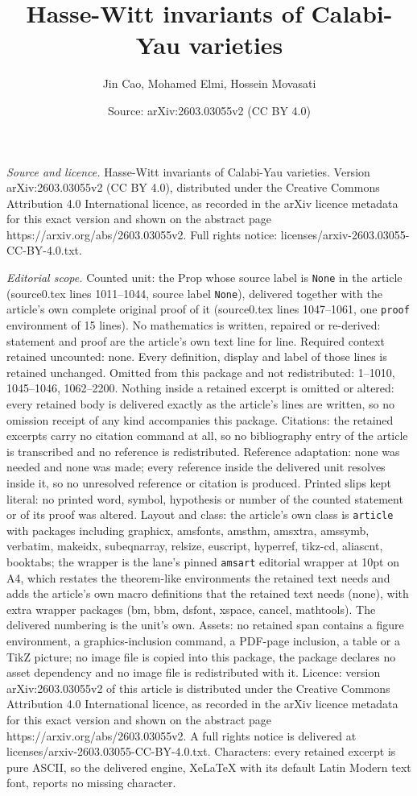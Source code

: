 \documentclass[10pt,a4paper]{amsart}
\title[Hasse-Witt invariants of Calabi-Yau varieties]{Hasse-Witt invariants of Calabi-Yau varieties}
\author{Jin Cao, Mohamed Elmi, Hossein Movasati}
\date{Source: arXiv:2603.03055v2 (CC BY 4.0)}
\begin{document}
\maketitle

\noindent\emph{Source and licence.} Hasse-Witt invariants of Calabi-Yau varieties. Version arXiv:2603.03055v2 (CC BY 4.0), distributed under the Creative Commons Attribution 4.0 International licence, as recorded in the arXiv licence metadata for this exact version and shown on the abstract page https://arxiv.org/abs/2603.03055v2. Full rights notice: licenses/arxiv-2603.03055-CC-BY-4.0.txt.\par\smallskip

\noindent\textit{Editorial scope.} Counted unit: the Prop whose source label is \texttt{None} in the article (source0.tex lines 1011--1044, source label \texttt{None}), delivered together with the article's own complete original proof of it (source0.tex lines 1047--1061, one \texttt{proof} environment of 15 lines). No mathematics is written, repaired or re-derived: statement and proof are the article's own text line for line. Required context retained uncounted: none. Every definition, display and label of those lines is retained unchanged. Omitted from this package and not redistributed: 1--1010, 1045--1046, 1062--2200. Nothing inside a retained excerpt is omitted or altered: every retained body is delivered exactly as the article's lines are written, so no omission receipt of any kind accompanies this package. Citations: the retained excerpts carry no citation command at all, so no bibliography entry of the article is transcribed and no reference is redistributed. Reference adaptation: none was needed and none was made; every reference inside the delivered unit resolves inside it, so no unresolved reference or citation is produced. Printed slips kept literal: no printed word, symbol, hypothesis or number of the counted statement or of its proof was altered. Layout and class: the article's own class is \texttt{article} with packages including graphicx, amsfonts, amsthm, amsxtra, amssymb, verbatim, makeidx, subeqnarray, relsize, euscript, hyperref, tikz-cd, aliascnt, booktabs; the wrapper is the lane's pinned \texttt{amsart} editorial wrapper at 10pt on A4, which restates the theorem-like environments the retained text needs and adds the article's own macro definitions that the retained text needs (none), with extra wrapper packages (bm, bbm, dsfont, xspace, cancel, mathtools). The delivered numbering is the unit's own. Assets: no retained span contains a figure environment, a graphics-inclusion command, a PDF-page inclusion, a table or a TikZ picture; no image file is copied into this package, the package declares no asset dependency and no image file is redistributed with it. Licence: version arXiv:2603.03055v2 of this article is distributed under the Creative Commons Attribution 4.0 International licence, as recorded in the arXiv licence metadata for this exact version and shown on the abstract page https://arxiv.org/abs/2603.03055v2. A full rights notice is delivered at licenses/arxiv-2603.03055-CC-BY-4.0.txt. Characters: every retained excerpt is pure ASCII, so the delivered engine, XeLaTeX with its default Latin Modern text font, reports no missing character.
\end{document}
